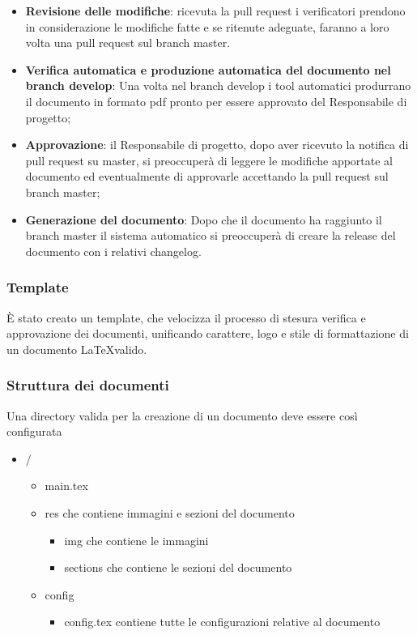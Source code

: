 \begin{itemize}
  \item \textbf{Revisione delle modifiche}: ricevuta la pull request i verificatori
  prendono in considerazione le modifiche fatte e se ritenute adeguate, faranno a
  loro volta una pull request sul branch master.

  \item \textbf{Verifica automatica e produzione automatica del documento nel
  branch develop}: Una volta nel branch develop i tool automatici produrrano il
  documento in formato pdf pronto per essere approvato del Responsabile di progetto;

  \item \textbf{Approvazione}: il Responsabile di progetto, dopo aver ricevuto la notifica
  di pull request su master, si preoccuper\`a di leggere le modifiche apportate al documento
  ed eventualmente di approvarle accettando la pull request sul branch master;

  \item \textbf{Generazione del documento}: Dopo che il documento ha raggiunto il
  branch master il sistema automatico si preoccuper\`a di creare la release del
  documento con i relativi changelog.
\end{itemize}

\subsubsection{Template}
\`E stato creato un template, che velocizza il processo di stesura verifica e
approvazione dei documenti, unificando carattere, logo e stile di formattazione
di un documento \LaTeX \space valido.

\subsubsection{Struttura dei documenti}
Una directory valida per la creazione di un documento deve essere così configurata
\begin{itemize}
  \item /
  \begin{itemize}
    \item main.tex
    \item res che contiene immagini e sezioni del documento
    \begin{itemize}
      \item img che contiene le immagini
      \item sections che contiene le sezioni del documento
    \end{itemize}
    \item config
    \begin{itemize}
      \item config.tex contiene tutte le configurazioni relative al documento
    \end{itemize}
  \end{itemize}
\end{itemize}
